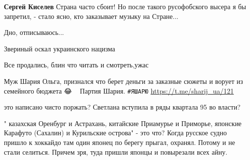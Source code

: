 \begin{itemize}
\begin{itemize}
 
\textbf{Сергей Киселев} Страна часто сбоит! Но после такого русофобского высера я бы запретил, - стало ясно, кто заказывает музыку на Стране...
\end{itemize}

 
Дно, отписываюсь...

 
Звериный оскал украинского нацизма

 
Все продались, блин что читать и смотреть,ужас

 

Муж Шария Ольга, признался что берет деньги за заказные сюжеты и ворует из семейного бюджета 😂🐓💭🎈
Партия Шария. \verb|#ЯШАРЮ| \url{https://t.me/sharij_ua/121}

 

это написано чисто поржать? Светлана вступила в ряды квартала 95 во власти?

" казахская Оренбург и Астрахань, китайские Приамурье и Приморье, японские
Карафуто (Сахалин) и Курильские острова" - это что? Когда русское судно пришло
к хоккайдо там один японец по берегу прыгал, охранял. Потому и не стали
селиться. Причем зря, туда пришли японцы и повырезали всех айну.


\end{itemize}
